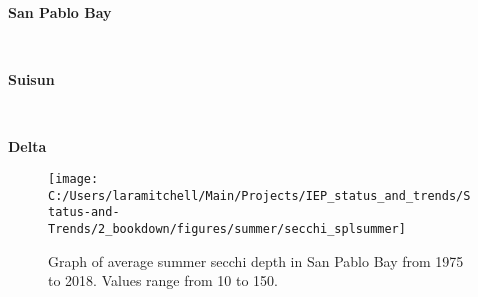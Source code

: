 \documentclass[
]{book}
\begin{document}
\begin{panel-grid}

\begin{columns-nocenter}

\begin{column800}

\textbf{San Pablo Bay}

\end{column800}

\begin{column40}

~

\end{column40}

\begin{column800}

\textbf{Suisun}

\end{column800}

\begin{column40}

~

\end{column40}

\begin{column800}

\textbf{Delta}

\end{column800}

\end{columns-nocenter}

\begin{columns-nocenter}

\begin{column800}

\begin{expand}

\begin{figure}
\texttt{[image: C:/Users/laramitchell/Main/Projects/IEP\_status\_and\_trends/Status-and-Trends/2\_bookdown/figures/summer/secchi\_splsummer]} \caption{Graph of average summer secchi depth in San Pablo Bay from 1975 to 2018. Values range from 10 to 150.}\label{fig:unnamed-chunk-51}
\end{figure}

\end{expand}

\end{column800}

\begin{column40}

~


\end{column40}
\end{columns-nocenter}
\end{panel-grid}
\end{document}
